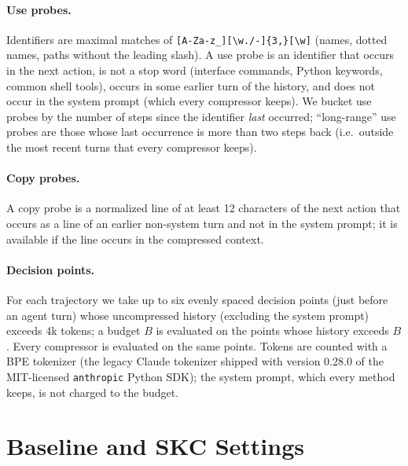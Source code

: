 \paragraph{Use probes.} Identifiers are maximal matches of
\texttt{[A-Za-z\_][\textbackslash w./-]\{3,\}[\textbackslash w]} (names, dotted names, paths
without the leading slash). A use probe is an identifier that occurs in the
next action, is not a stop word (interface commands, Python keywords, common
shell tools), occurs in some earlier turn of the history, and does not occur
in the system prompt (which every compressor keeps). We bucket use probes by the
number of steps since the identifier \emph{last} occurred; ``long-range'' use
probes are those whose last occurrence is more than two steps back (i.e.\
outside the most recent turns that every compressor keeps).

\paragraph{Copy probes.} A copy probe is a normalized line of at least 12
characters of the next action that occurs as a line of an earlier non-system
turn and not in the system prompt; it is available if the line occurs in the
compressed context.

\paragraph{Decision points.} For each trajectory we take up to six evenly
spaced decision points (just before an agent turn) whose uncompressed history
(excluding the system prompt) exceeds 4k tokens; a budget $B$ is evaluated on
the points whose history exceeds $B$. Every compressor is evaluated on the same
points. Tokens are counted with a BPE tokenizer (the legacy Claude tokenizer
shipped with version 0.28.0 of the MIT-licensed \texttt{anthropic} Python SDK);
the system prompt, which every method keeps, is not charged to the budget.

\section{Baseline and SKC Settings}
\label{app:settings}

